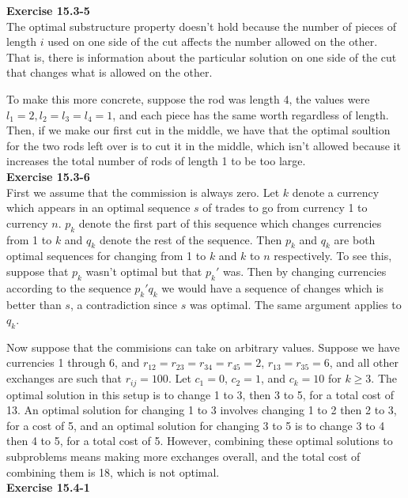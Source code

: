 \documentclass{article}
\begin{document}
\noindent\textbf{Exercise 15.3-5}\\

The optimal substructure property doesn't hold because the number of pieces of length $i$ used on one side of the cut affects the number allowed on the other. That is, there is information about the particular solution on one side of the cut that changes what is allowed on the other.

To make this more concrete, suppose the rod was length 4, the values were $l_1 = 2, l_2 = l_3= l_4 =1$, and each piece has the same worth regardless of length. Then, if we make our first cut in the middle, we have that the optimal soultion for the two rods left over is to cut it in the middle, which isn't allowed because it increases the total number of rods of length 1 to be too large.\\

\noindent\textbf{Exercise 15.3-6}\\

First we assume that the commission is always zero.  Let $k$ denote a currency which appears in an optimal sequence $s$ of trades to go from currency 1 to currency $n$.  $p_k$ denote the first part of this sequence which changes currencies from 1 to $k$ and $q_k$ denote the rest of the sequence.  Then $p_k$ and $q_k$ are both optimal sequences for changing from 1 to $k$ and $k$ to $n$ respectively.  To see this, suppose that $p_k$ wasn't optimal but that $p_k'$ was.  Then by changing currencies according to the sequence $p_k' q_k$ we would have a sequence of changes which is better than $s$, a contradiction since $s$ was optimal.  The same argument applies to $q_k$.

Now suppose that the commisions can take on arbitrary values.  Suppose we have currencies 1 through 6, and $r_{12} = r_{23} = r_{34} = r_{45} = 2$, $r_{13} = r_{35} = 6$, and all other exchanges are such that $r_{ij} = 100$.  Let $c_1 = 0$, $c_2 = 1$, and $c_k = 10$ for $k \geq 3$.  The optimal solution in this setup is to change 1 to 3, then 3 to 5, for a total cost of 13.  An optimal solution for changing 1 to 3 involves changing 1 to 2 then 2 to 3, for a cost of 5, and an optimal solution for changing 3 to 5 is to change 3 to 4 then 4 to 5, for a total cost of 5.  However, combining these optimal solutions to subproblems means making more exchanges overall, and the total cost of combining them is 18, which is not optimal. \\

\noindent\textbf{Exercise 15.4-1}\\
\end{document}
